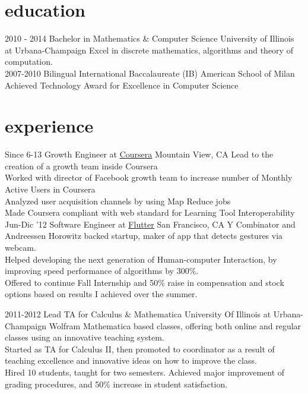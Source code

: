 \documentclass[]{mre-cv}
\begin{document}
\section{education}

\begin{entrylist}
  \entry
    {2010 - 2014}
    {Bachelor in Mathematics \& Computer Science }
    {University of Illinois at Urbana-Champaign}
    {Excel in discrete mathematics, algorithms and theory of computation.\\}
  \entry
    {2007-2010}
    {Bilingual International Baccalaureate (IB)}
    {American School of Milan}
    {Achieved Technology Award for Excellence in Computer Science}
\end{entrylist}

\section{experience}

\begin{entrylist}
  \entry
    {Since 6-13}
    {Growth Engineer at \href{http://www.coursera.org}{\underline{Coursera}}}
    {Mountain View, CA}
    {Lead to the creation of a growth team inside Coursera  \\
     Worked with director of Facebook growth team to increase number of Monthly Active Users in Coursera \\
     Analyzed user acquisition channels by using Map Reduce jobs \\
     Made Coursera compliant with web standard for Learning Tool Interoperability 
    }
  \entry
    {Jun-Dic '12}
    {Software Engineer at \href{http://www.flutterapp.com}{\underline{Flutter}}}
    {San Francisco, CA}
    {Y Combinator and Andreessen Horowitz backed startup, maker of app that detects  gestures via webcam. \\
    Helped developing the next generation of Human-computer Interaction, by improving speed performance of algorithms by 300\%. \\
    Offered to continue Fall Internship and 50\% raise in compensation and stock options based on results I achieved over the summer.\\
    }
    
    \entry
    {2011-2012}
    {Lead TA for Calculus \& Mathematica}
    {University Of Illinois at Urbana-Champaign}
    { Wolfram Mathematica based classes, offering both online and regular classes using an innovative teaching system.\\
    Started as TA for Calculus II, then promoted to coordinator as a result of teaching excellence and innovative ideas on how to improve the class.\\
    Hired 10 students, taught for two semesters. Achieved major improvement of grading procedures, and 50\% increase in student satisfaction. \\}
\end{entrylist}
\end{document}
